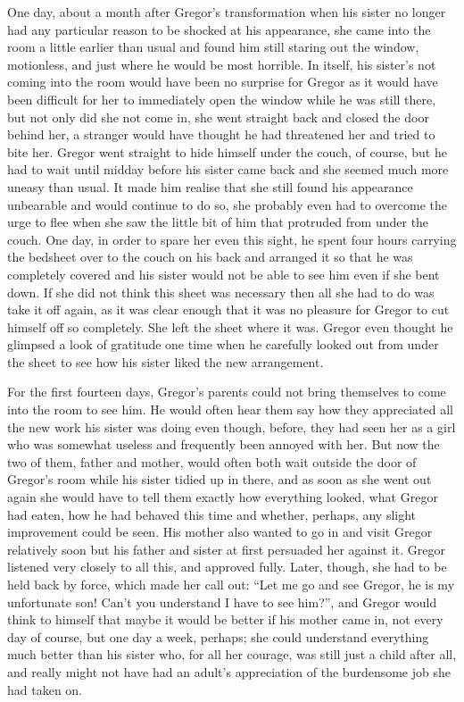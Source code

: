 One day, about a month after Gregor’s transformation when his sister no
longer had any particular reason to be shocked at his appearance, she
came into the room a little earlier than usual and found him still
staring out the window, motionless, and just where he would be most
horrible. In itself, his sister’s not coming into the room would have
been no surprise for Gregor as it would have been difficult for her to
immediately open the window while he was still there, but not only did
she not come in, she went straight back and closed the door behind her,
a stranger would have thought he had threatened her and tried to bite
her. Gregor went straight to hide himself under the couch, of course,
but he had to wait until midday before his sister came back and she
seemed much more uneasy than usual. It made him realise that she still
found his appearance unbearable and would continue to do so, she
probably even had to overcome the urge to flee when she saw the little
bit of him that protruded from under the couch. One day, in order to
spare her even this sight, he spent four hours carrying the bedsheet
over to the couch on his back and arranged it so that he was completely
covered and his sister would not be able to see him even if she bent
down. If she did not think this sheet was necessary then all she had to
do was take it off again, as it was clear enough that it was no
pleasure for Gregor to cut himself off so completely. She left the
sheet where it was. Gregor even thought he glimpsed a look of gratitude
one time when he carefully looked out from under the sheet to see how
his sister liked the new arrangement.

For the first fourteen days, Gregor’s parents could not bring
themselves to come into the room to see him. He would often hear them
say how they appreciated all the new work his sister was doing even
though, before, they had seen her as a girl who was somewhat useless
and frequently been annoyed with her. But now the two of them, father
and mother, would often both wait outside the door of Gregor’s room
while his sister tidied up in there, and as soon as she went out again
she would have to tell them exactly how everything looked, what Gregor
had eaten, how he had behaved this time and whether, perhaps, any
slight improvement could be seen. His mother also wanted to go in and
visit Gregor relatively soon but his father and sister at first
persuaded her against it. Gregor listened very closely to all this, and
approved fully. Later, though, she had to be held back by force, which
made her call out: “Let me go and see Gregor, he is my unfortunate son!
Can’t you understand I have to see him?”, and Gregor would think to
himself that maybe it would be better if his mother came in, not every
day of course, but one day a week, perhaps; she could understand
everything much better than his sister who, for all her courage, was
still just a child after all, and really might not have had an adult’s
appreciation of the burdensome job she had taken on.

